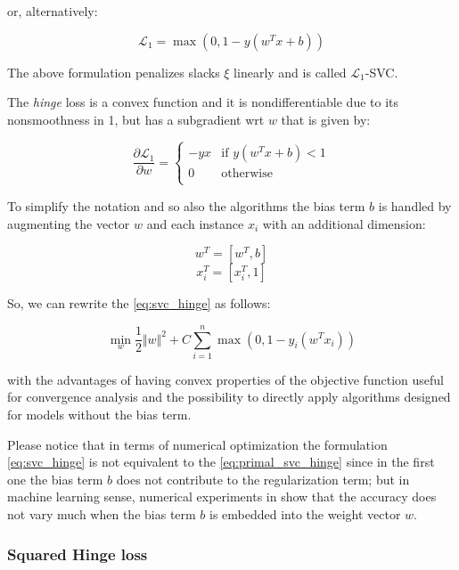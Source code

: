 or, alternatively:

\begin{equation}
	\mathcal{L}_1 = \max(0, 1 - y (w^T x + b)) \label{eq:hinge2}
\end{equation}

The above formulation penalizes slacks $\xi$ linearly and is called $\mathcal{L}_1$-SVC.

The \emph{hinge} loss is a convex function and it is nondifferentiable due to its nonsmoothness in 1, but has a subgradient wrt $w$ that is given by:

\begin{equation}
    \frac{\partial \mathcal{L}_1}{\partial w}=
        \begin{cases}
            -y x & \text{if } y (w^T x + b) < 1 \\
            0 & \text{otherwise} \\ 
        \end{cases} \label{eq:hinge_der}
\end{equation}

To simplify the notation and so also the algorithms the bias term $b$ is handled by augmenting the vector $w$ and each instance $x_i$ with an additional dimension:

$$w^T = [w^T, b]$$
$$x_i^T = [x_i^T, 1]$$

So, we can rewrite the \ref{eq:svc_hinge} as follows:

\begin{equation}
    \min_{w} \frac{1}{2} \Vert w \Vert^2 + C \sum_{i=1}^n \max(0, 1 - y_i (w^T x_i)) \label{eq:primal_svc_hinge}
\end{equation}

with the advantages of having convex properties of the objective function useful for convergence analysis and the possibility to directly apply algorithms designed for models without the bias term.

Please notice that in terms of numerical optimization the formulation \ref{eq:svc_hinge} is not equivalent to the \ref{eq:primal_svc_hinge} since in the first one the bias term $b$ does not contribute to the regularization term; but in machine learning sense, numerical experiments in \cite{hsu2002simple} show that the accuracy does not vary much when the bias term $b$ is embedded into the weight vector $w$.

\subsubsection{Squared Hinge loss}

